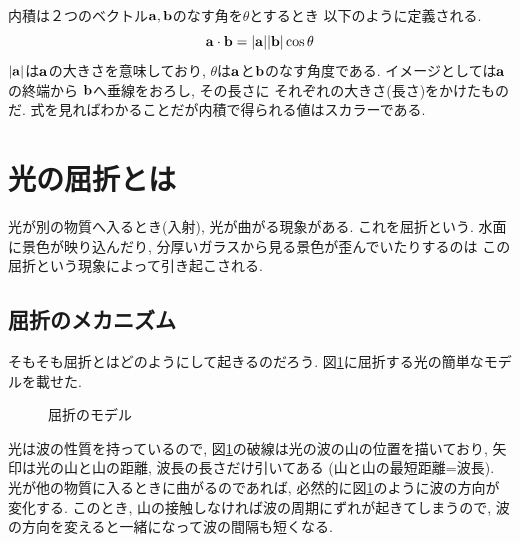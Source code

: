 \documentclass[a4paper, xelatex, ja=standard]{bxjsarticle}
\begin{document}
内積は２つのベクトル$\vb{a, b}$のなす角を$\theta$とするとき
以下のように定義される.
\[
\vb{a}\cdot\vb{b}=|\vb{a}||\vb{b}|\cos{\theta}
\]
$|\vb{a}|$は$\vb{a}$の大きさを意味しており,
$\theta$は$\vb{a}$と$\vb{b}$のなす角度である.
イメージとしては$\vb{a}$の終端から
$\vb{b}$へ垂線をおろし, その長さに
それぞれの大きさ(長さ)をかけたものだ.
式を見ればわかることだが内積で得られる値はスカラーである.

\section{光の屈折とは}
光が別の物質へ入るとき(入射),
光が曲がる現象がある.
これを屈折という.
水面に景色が映り込んだり,
分厚いガラスから見る景色が歪んでいたりするのは
この屈折という現象によって引き起こされる.

\subsection{屈折のメカニズム}
そもそも屈折とはどのようにして起きるのだろう.
図\ref{fig:light-refraction}に屈折する光の簡単なモデルを載せた.
\begin{figure}[h]
\centering
\caption{屈折のモデル}
\label{fig:light-refraction}
\end{figure}
光は波の性質を持っているので,
図\ref{fig:light-refraction}の破線は光の波の山の位置を描いており,
矢印は光の山と山の距離, 波長の長さだけ引いてある
(山と山の最短距離=波長).
光が他の物質に入るときに曲がるのであれば,
必然的に図\ref{fig:light-refraction}のように波の方向が変化する.
このとき, 山の接触しなければ波の周期にずれが起きてしまうので,
波の方向を変えると一緒になって波の間隔も短くなる.
\end{document}
